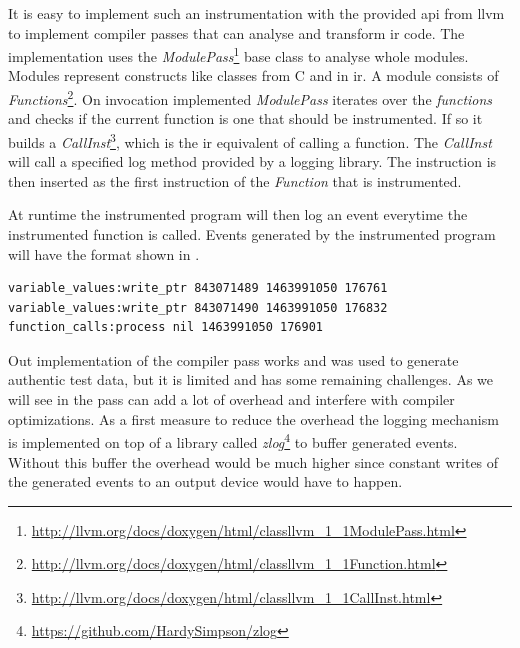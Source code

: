 It is easy to implement such an instrumentation with the provided \CC \gls{api} from \gls{llvm} to implement compiler passes that can analyse and transform \gls{ir} code.
The implementation uses the \emph{ModulePass}\footnote{\url{http://llvm.org/docs/doxygen/html/classllvm_1_1ModulePass.html}} base class to analyse whole modules.
Modules represent constructs like classes from C and \CC in \gls{ir}.
A module consists of \emph{Functions}\footnote{\url{http://llvm.org/docs/doxygen/html/classllvm_1_1Function.html}}.
On invocation implemented \emph{ModulePass} iterates over the \emph{functions} and checks if the current function is one that should be instrumented.
If so it builds a \emph{CallInst}\footnote{\url{http://llvm.org/docs/doxygen/html/classllvm_1_1CallInst.html}}, which is the \gls{ir} equivalent of calling a function.
The \emph{CallInst} will call a specified log method provided by a logging library.
The instruction is then inserted as the first instruction of the \emph{Function} that is instrumented.

At runtime the instrumented program will then log an event everytime the instrumented function is called.
Events generated by the instrumented program will have the format shown in .

\begin{lstlisting}[numbers=none,float,caption={[Trace data format of the instrumentation pass]Trace data generated by the instrumentation pass. Each line represents an event and each event consists of four pieces seperated by spaces: a stream name, an optional value and the timestamp in unix format followed by the amount of microseconds since that timestamp.},label=listing:instrumentation_trace_data]
variable_values:write_ptr 843071489 1463991050 176761
variable_values:write_ptr 843071490 1463991050 176832
function_calls:process nil 1463991050 176901
\end{lstlisting}

Out implementation of the compiler pass works and was used to generate authentic test data, but it is limited and has some remaining challenges.
As we will see in  the pass can add a lot of overhead and interfere with compiler optimizations.
As a first measure to reduce the overhead the logging mechanism is implemented on top of a library called \emph{zlog}\footnote{\url{https://github.com/HardySimpson/zlog}} to buffer generated events.
Without this buffer the overhead would be much higher since constant writes of the generated events to an output device would have to happen.

